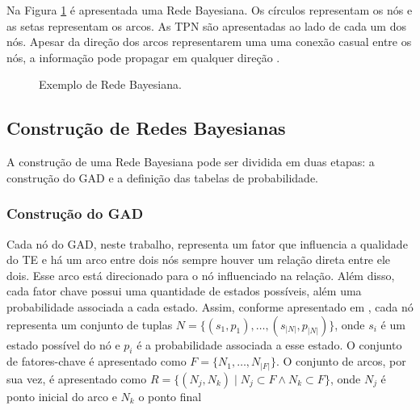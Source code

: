 Na Figura \ref{fundamentacao:redes:eq} é apresentada uma Rede Bayesiana. Os círculos representam os nós e as setas representam os arcos. As TPN são apresentadas ao lado de cada um dos nós. Apesar da direção dos arcos representarem uma uma conexão casual entre os nós, a informação pode propagar em qualquer direção \cite{pearl}.

\begin{figure}[H]
\begin{center}
    \end{center}
    \caption{Exemplo de Rede Bayesiana.}
    \label{fundamentacao:redes:eq}
\end{figure}

\subsection{Construção de Redes Bayesianas}
\label{fundamentacao:redes:construcao}

A construção de uma Rede Bayesiana pode ser dividida em duas etapas: a construção do GAD e a definição das tabelas de probabilidade. 

\subsubsection{Construção do GAD}
\label{fundamentacao:redes:construcao:gad}

Cada nó do GAD, neste trabalho, representa um fator que influencia a qualidade do TE e há um arco entre dois nós sempre houver um relação direta entre ele dois. Esse arco está direcionado para o nó influenciado na relação. Além disso, cada fator chave possui uma quantidade de estados possíveis, além uma probabilidade associada a cada estado. Assim, conforme apresentado em \cite{perkusich2013}, cada nó representa um conjunto de tuplas $N = \{(s_{1},p_{1}), \ldots, (s_{\left|{N}\right|},p_{\left|{N}\right|})\}$, onde $s_{i}$ é um estado possível do nó e $p_{i}$ é a probabilidade associada a esse estado. O conjunto de fatores-chave é apresentado como $F = \{N_{1}, \ldots, N_{\left|{F}\right|}\}$. O conjunto de arcos, por sua vez, é apresentado como $R = \{(N_{j},N_{k}) \mid N_{j} \subset F \wedge N_{k} \subset F\}$, onde $N_{j}$ é ponto inicial do arco e $N_{k}$ o ponto final

